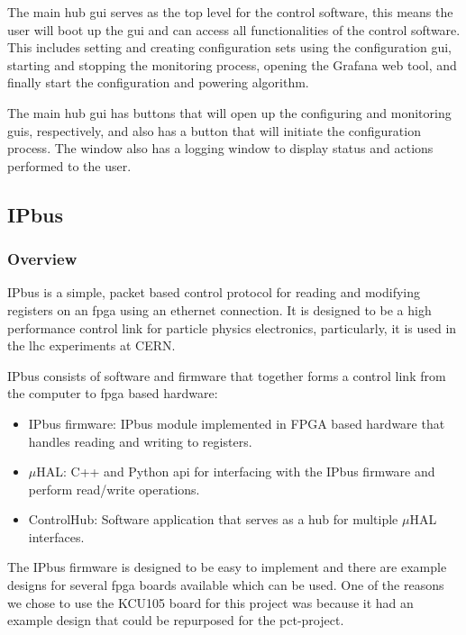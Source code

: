\documentclass[main.tex]{subfiles}
\begin{document}
The main hub \gls{gui} serves as the top level for the control software, this means the user will boot up the \gls{gui} and can access all functionalities of the control software. This includes setting and creating configuration sets using the configuration \gls{gui}, starting and stopping the monitoring process, opening the Grafana web tool, and finally start the configuration and powering algorithm.

The main hub \gls{gui} has buttons that will open up the configuring and monitoring \gls{gui}s, respectively, and also has a button that will initiate the configuration process. The window also has a logging window to display status and actions performed to the user.


\subsection{IPbus}
 \subsubsection{Overview}
 
 IPbus is a simple, packet based control protocol for reading and modifying registers on an \gls{fpga} using an ethernet connection. It is designed to be a high performance control link for particle physics electronics, particularly, it is used in the \gls{lhc} experiments at CERN.
 
IPbus consists of software and firmware that together forms a control link from the computer to \gls{fpga} based hardware:

\begin{itemize}
    \item IPbus firmware: IPbus module implemented in FPGA based hardware that handles reading and writing to registers.
    \item $\mu$HAL: C++ and Python \gls{api} for interfacing with the IPbus firmware and perform read/write operations.
    \item ControlHub: Software application that serves as a hub for multiple $\mu$HAL interfaces.
\end{itemize}  

The IPbus firmware is designed to be easy to implement and there are example designs for several \gls{fpga} boards available which can be used. One of the reasons we chose to use the KCU105 board for this project was because it had an example design that could be repurposed for the \gls{pct}-project.
\end{document}
